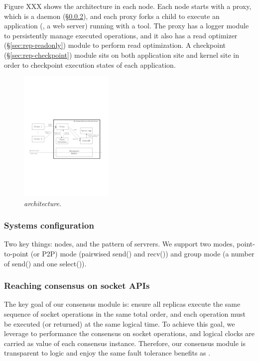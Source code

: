 Figure XXX shows the \msmr architecture in each node. Each node starts with a proxy, 
which is a \paxos daemon (\S\ref{sec:rep-consensus}), and each proxy forks a child to execute an 
application (\eg, a web server) running with a \smt tool. The proxy has a logger module to 
persistently manage executed operations, and it also has a read optimizer (\S\ref{sec:rep-readonly})
module to perform read optimization. A checkpoint (\S\ref{sec:rep-checkpoint}) module sits on both 
application site and kernel site in order to checkpoint execution states of each application.

\begin{figure}[t]
\centering
\includegraphics[width=0.4\textwidth]{figures/architecture}
\vspace{-.05in}
\caption{{\em \msmr architecture.}} \label{fig:arch}
\vspace{-.05in}
\end{figure}


\subsubsection{Systems configuration} \label{sec:rep-config}

Two key things: nodes, and the pattern of servrers. We support two modes, 
point-to-point (or P2P) mode (pairwised send() and recv()) and group mode (a number of send() 
and one select()).

\subsubsection{Reaching consensus on socket APIs} \label{sec:rep-consensus}
The key goal of our consensus module is: ensure all replicas execute the same 
sequence of socket operations in the same total order, and each operation must 
be executed (or returned) at the same logical time. To achieve this goal, we 
leverage \paxos to performance the consensus on socket operations, and 
logical clocks are carried as value of each consensus instance. Therefore, our 
consensus module is transparent to \paxos logic and enjoy the same fault tolerance 
benefits as \paxos.

